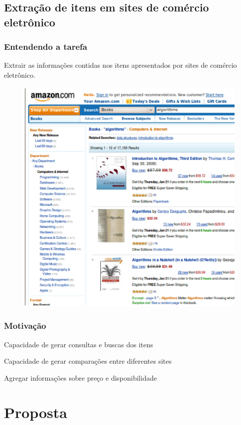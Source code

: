 \documentclass{beamer}
\newenvironment{my_itemize}{
\begin{itemize}
  \setlength{\itemsep}{5pt}
  \setlength{\parskip}{2pt}
  \setlength{\parsep}{3pt}
}{\end{itemize}}
\begin{document}
\subsection{Extração de itens em sites de comércio eletrônico}
\begin{frame}
\frametitle{Entendendo a tarefa}
Extrair as informações contidas nos itens apresentados por sites de comércio eletrônico.

\begin{figure}[h!]
    \center
    \includegraphics[scale=0.25]{img/ce}
\end{figure}

\end{frame}

\begin{frame}
\frametitle{Motivação}
    \begin{my_itemize}
    \item Capacidade de gerar consultas e buscas dos itens
    \item Capacidade de gerar comparações entre diferentes sites
    \item Agregar informações sobre preço e disponibilidade
    \end{my_itemize}
\end{frame}

\section{Proposta}
\end{document}
